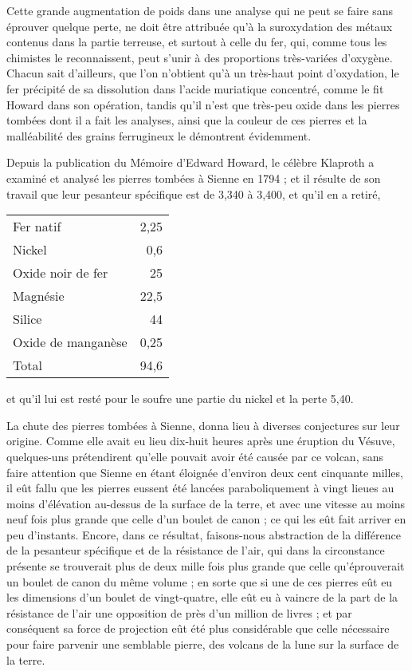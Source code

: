 \documentclass[a4paper, 12pt, oneside, french]{article}
\begin{document}
Cette grande augmentation de poids dans une analyse qui ne peut se faire sans éprouver quelque perte, ne doit être attribuée qu'à la suroxydation des métaux contenus dans la partie terreuse, et surtout à celle du fer, qui, comme tous les chimistes le reconnaissent, peut s'unir à des proportions très-variées d'oxygène. Chacun sait d'ailleurs, que l'on n'obtient qu'à un très-haut point d'oxydation, le fer précipité de sa dissolution dans l'acide muriatique concentré, comme le fit Howard dans son opération, tandis qu'il n'est que très-peu oxide dans les pierres tombées dont il a fait les analyses, ainsi que la couleur de ces pierres et la malléabilité des grains ferrugineux le démontrent évidemment.

Depuis la publication du Mémoire d'Edward Howard, le célèbre Klaproth a examiné et analysé les pierres tombées à Sienne en 1794 ; et il résulte de son travail que leur pesanteur spécifique est de 3,340 à 3,400, et qu'il en a retiré,
\begin{table}[H]
    \centering
    \begin{tabular}{l r}
        Fer natif & 2,25 \\
        Nickel & 0,6 \\
        Oxide noir de fer & 25 \\
        Magnésie & 22,5 \\
        Silice & 44 \\
        Oxide de manganèse & 0,25 \\ \hline
        Total & 94,6 \\
    \end{tabular}
\end{table}
et qu'il lui est resté pour le soufre une partie du nickel et la perte 5,40.

La chute des pierres tombées à Sienne, donna lieu à diverses conjectures sur leur origine. Comme elle avait eu lieu dix-huit heures après une éruption du Vésuve, quelques-uns prétendirent qu'elle pouvait avoir été causée par ce volcan, sans faire attention que Sienne en étant éloignée d'environ deux cent cinquante milles, il eût fallu que les pierres eussent été lancées paraboliquement à vingt lieues au moins d'élévation au-dessus de la surface de la terre, et avec une vitesse au moins neuf fois plus grande que celle d'un boulet de canon ; ce qui les eût fait arriver en peu d'instants. Encore, dans ce résultat, faisons-nous abstraction de la différence de la pesanteur spécifique et de la résistance de l'air, qui dans la circonstance présente se trouverait plus de deux mille fois plus grande que celle qu'éprouverait un boulet de canon du même volume ; en sorte que si une de ces pierres eût eu les dimensions d'un boulet de vingt-quatre, elle eût eu à vaincre de la part de la résistance de l'air une opposition de près d'un million de livres ; et par conséquent sa force de projection eût été plus considérable que celle nécessaire pour faire parvenir une semblable pierre, des volcans de la lune sur la surface de la terre.
\end{document}
